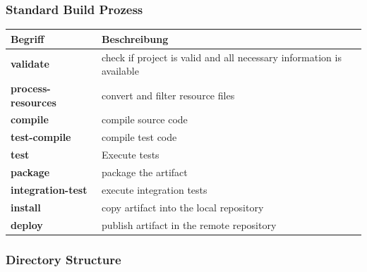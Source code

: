 \documentclass[10pt]{article}
\begin{document}
    \subsubsection{Standard Build Prozess}
    \begin{center}
    	
    \begin{tabular}{|ll|c}
        \hline
        Begriff & Beschreibung  \\
        \hline
        \textbf{validate} & check if project is valid and all necessary information is available \\
        \textbf{process-resources} & convert and filter resource files \\
        \textbf{compile} & compile source code \\
        \textbf{test-compile} & compile test code \\
        \textbf{test} & Execute tests \\
        \textbf{package} & package the artifact \\
        \textbf{integration-test} & execute integration tests \\
        \textbf{install} & copy artifact into the local repository \\
        \textbf{deploy} & publish artifact in the remote repository \\
        \hline
    \end{tabular}
     \end{center}

    \subsubsection{Directory Structure}
\end{document}
